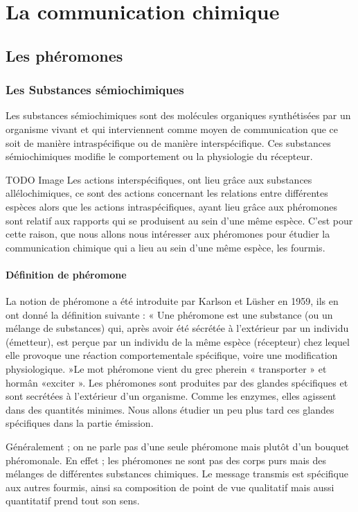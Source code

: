 \chapter{La communication chimique}
\section{Les phéromones}
\subsection{Les Substances sémiochimiques}

Les substances sémiochimiques sont des molécules organiques synthétisées
par un organisme vivant et qui interviennent comme moyen de
communication que ce soit de manière intraspécifique ou de manière
interspécifique. Ces substances sémiochimiques modifie le comportement
ou la physiologie du récepteur.

TODO Image Les actions interspécifiques, ont lieu grâce aux substances
allélochimiques, ce sont des actions concernant les relations entre
différentes espèces alors que les actions intraspécifiques, ayant lieu
grâce aux phéromones sont relatif aux rapports qui se produisent au sein
d'une même espèce. C'est pour cette raison, que nous allons nous
intéresser aux phéromones pour étudier la communication chimique qui a
lieu au sein d'une même espèce, les fourmis.

\subsubsection{Définition de phéromone}

La notion de phéromone a été introduite par Karlson et Lüsher en 1959,
ils en ont donné la définition suivante : « Une phéromone est une
substance (ou un mélange de substances) qui, après avoir été sécrétée à
l'extérieur par un individu (émetteur), est perçue par un individu de la
même espèce (récepteur) chez lequel elle provoque une réaction
comportementale spécifique, voire une modification physiologique. »Le
mot phéromone vient du grec pherein « transporter » et hormân «exciter
». Les phéromones sont produites par des glandes spécifiques et sont
secrétées à l'extérieur d'un organisme. Comme les enzymes, elles
agissent dans des quantités minimes. Nous allons étudier un peu plus
tard ces glandes spécifiques dans la partie émission.

Généralement ; on ne parle pas d'une seule phéromone mais plutôt d'un
bouquet phéromonale. En effet ; les phéromones ne sont pas des corps
purs mais des mélanges de différentes substances chimiques. Le message
transmis est spécifique aux autres fourmis, ainsi sa composition de
point de vue qualitatif mais aussi quantitatif prend tout son sens.

